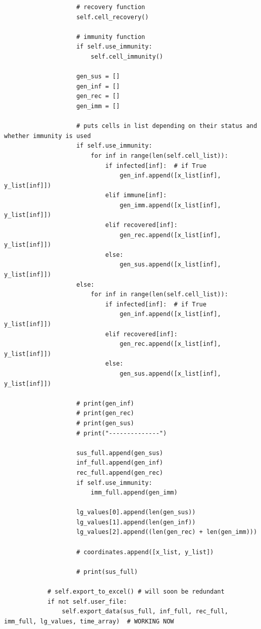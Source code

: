 \documentclass[11pt, a4paper]{article}
\begin{document}
\begin{lstlisting}
                    # recovery function
                    self.cell_recovery()
    
                    # immunity function
                    if self.use_immunity:
                        self.cell_immunity()
    
                    gen_sus = []
                    gen_inf = []
                    gen_rec = []
                    gen_imm = []
    
                    # puts cells in list depending on their status and whether immunity is used
                    if self.use_immunity:
                        for inf in range(len(self.cell_list)):
                            if infected[inf]:  # if True
                                gen_inf.append([x_list[inf], y_list[inf]])
                            elif immune[inf]:
                                gen_imm.append([x_list[inf], y_list[inf]])
                            elif recovered[inf]:
                                gen_rec.append([x_list[inf], y_list[inf]])
                            else:
                                gen_sus.append([x_list[inf], y_list[inf]])
                    else:
                        for inf in range(len(self.cell_list)):
                            if infected[inf]:  # if True
                                gen_inf.append([x_list[inf], y_list[inf]])
                            elif recovered[inf]:
                                gen_rec.append([x_list[inf], y_list[inf]])
                            else:
                                gen_sus.append([x_list[inf], y_list[inf]])
    
                    # print(gen_inf)
                    # print(gen_rec)
                    # print(gen_sus)
                    # print("--------------")
    
                    sus_full.append(gen_sus)
                    inf_full.append(gen_inf)
                    rec_full.append(gen_rec)
                    if self.use_immunity:
                        imm_full.append(gen_imm)
    
                    lg_values[0].append(len(gen_sus))
                    lg_values[1].append(len(gen_inf))
                    lg_values[2].append((len(gen_rec) + len(gen_imm)))
    
                    # coordinates.append([x_list, y_list])
    
                    # print(sus_full)
    
            # self.export_to_excel() # will soon be redundant
            if not self.user_file:
                self.export_data(sus_full, inf_full, rec_full, imm_full, lg_values, time_array)  # WORKING NOW
    

\end{lstlisting}
\end{document}
